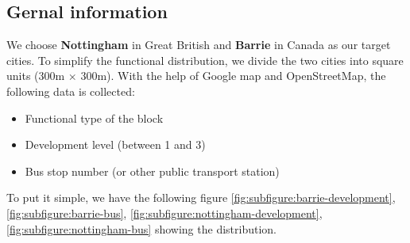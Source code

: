 \subsection{Gernal information}
We choose \textbf{Nottingham} in Great British and \textbf{Barrie} in Canada as our target cities.
To simplify the functional distribution, we divide the two cities into square units (300m $\times$ 300m).
With the help of Google map and OpenStreetMap, the following data is collected:
\begin{itemize}
  \item Functional type of the block
  \item Development level (between 1 and 3)
  \item Bus stop number (or other public transport station)
\end{itemize}
To put it simple, we have the following figure \ref{fig:subfigure:barrie-development}, \ref{fig:subfigure:barrie-bus}, \ref{fig:subfigure:nottingham-development}, \ref{fig:subfigure:nottingham-bus} showing the distribution.
